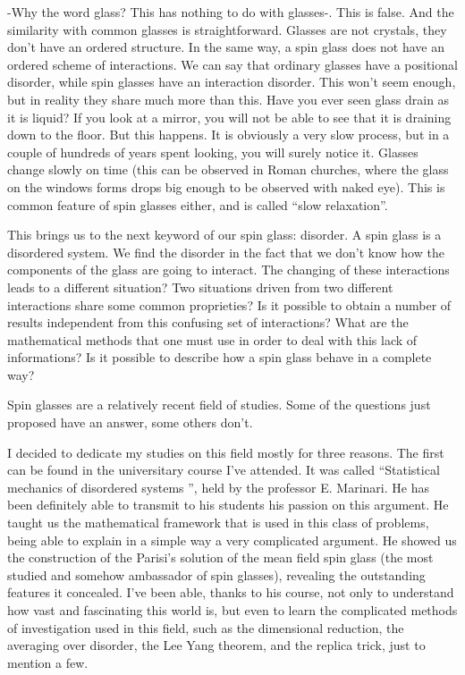 -Why the word glass? This has nothing to do with glasses-. This is false. And the similarity with common glasses is straightforward. Glasses are not crystals, they don't have an ordered structure. In the same way, a spin glass does not have an ordered scheme of interactions. We can say that ordinary glasses have a positional disorder, while spin glasses have an interaction disorder. This won't seem enough, but in reality they share much more than this. Have you ever seen glass drain as it is liquid? If you look at a mirror, you will not be able to see that it is draining down to the floor. But this happens. It is obviously a very slow process, but in a couple of hundreds of years spent looking, you will surely notice it. Glasses change slowly on time (this can be observed in Roman churches, where the glass on the windows forms drops big enough to be observed with naked eye).
This is common feature of spin glasses either, and is called \textquotedblleft slow relaxation\textquotedblright.

This brings us to the next keyword of our spin glass: disorder. A spin glass is a disordered system. We find the disorder in the fact that we don't know how the components of the glass are going to interact. The changing of these interactions leads to a different situation? Two situations driven from two different interactions share some common proprieties? Is it possible to obtain a number of results independent from this confusing set of interactions?
What are the mathematical methods that one must use in order to deal with this lack of informations? Is it possible to describe how a spin glass behave in a complete way?

Spin glasses are a relatively recent field of studies. Some of the questions just proposed have an answer, some others don't.

\vspace

I decided to dedicate my studies on this field mostly for three reasons. The first can be found in the universitary course I've attended. It was called \textquotedblleft Statistical mechanics of disordered systems \textquotedblright, held by the professor E. Marinari. He has been definitely able to transmit to his students his passion on this argument. He taught us the mathematical framework that is used in this class of problems, being able to explain in a simple way a very complicated argument. He showed us the construction of the Parisi's solution of the mean field spin glass (the most studied and somehow ambassador of spin glasses), revealing the outstanding features it concealed. I've been able, thanks to his course, not only to understand how vast and fascinating this world is, but even to learn the complicated methods of investigation used in this field, such as the dimensional reduction, the averaging over disorder, the Lee Yang theorem, and the replica trick, just to mention a few.

